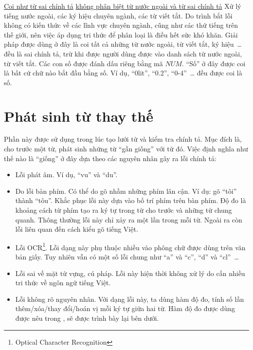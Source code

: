 \documentclass[a4paper,oneside]{book} %
\newcommand{\note}[1]{\underline{#1}}
\theoremstyle{break}
\begin{document}
\note{Coi như từ sai chính tả}
\note{không phân biệt từ nước ngoài và từ sai chính tả}
Xử lý tiếng nước ngoài, các ký hiệu chuyên ngành, các từ viết tắt. Do
trình bắt lỗi không có kiến thức về các lĩnh vực chuyên 
ngành, cũng như các thứ tiếng trên thế giới, nên việc áp dụng tri thức
để phân loại là điều hết sức khó khăn. Giải pháp được dùng ở đây là
coi tất cả những từ nước ngoài, từ viết tắt, ký hiệu~\ldots đều là sai
chính tả, trừ khi được người dùng được vào danh sách từ nước ngoài, từ
viết tắt. Các con số được đánh dấu riêng bằng mã $NUM$.
``Số'' ở đây được coi là bất cứ chữ nào bắt đầu bằng số. Ví dụ, ``0lit'',
``0.2'', ``0-4''~\ldots{} đều được coi là số. 

\section{Phát sinh từ thay thế}

Phần này được sử dụng trong lúc tạo lưới từ và kiểm tra chính
tả. Mục đích là, cho trước một từ, phát sinh những từ ``gần giống''
với từ đó. Việc định nghĩa như thế nào là ``giống'' ở đây dựa theo các
nguyên nhân gây ra lỗi chính tả:
\begin{itemize}
\item Lỗi phát âm. Ví dụ, ``vu'' và ``du''. 
\item Do lỗi bàn phím. Có thể do gõ nhầm những phím lân cận. Ví dụ: gõ
  ``tôi'' thành ``tôu''. Khắc phục lỗi này dựa vào bố trí phím trên
  bàn phím. Độ đo là khoảng cách từ phím tạo ra ký tự trong từ cho
  trước và những từ chung quanh. Thông thường lỗi này chỉ xảy ra một
  lần trong mỗi từ. Ngoài ra còn lỗi liên quan đến cách kiểu gõ tiếng
  Việt.
\item Lỗi OCR\footnote{Optical Character Recognition}. Lỗi dạng này
  phụ thuộc nhiều vào phông chữ được dùng trên văn bản giấy. Tuy nhiên
  vẫn có một số lỗi chung như ``a'' và ``c'', ``d'' và ``cl''~\ldots
\item Lỗi sai về mặt từ vựng, cú pháp. Lỗi này hiện thời không xử lý
  do cần nhiều tri thức về ngôn ngữ tiếng Việt.
\item Lỗi không rõ nguyên nhân. Với dạng lỗi này, ta dùng hàm độ đo,
  tính số lần thêm/xóa/thay đổi/hoán vị mỗi ký tự giữa hai từ. Hàm độ đo
  được dùng được nêu trong \cite{Oflazer}, sẽ được trình bày lại bên
  dưới.
\end{itemize}

\end{document}
